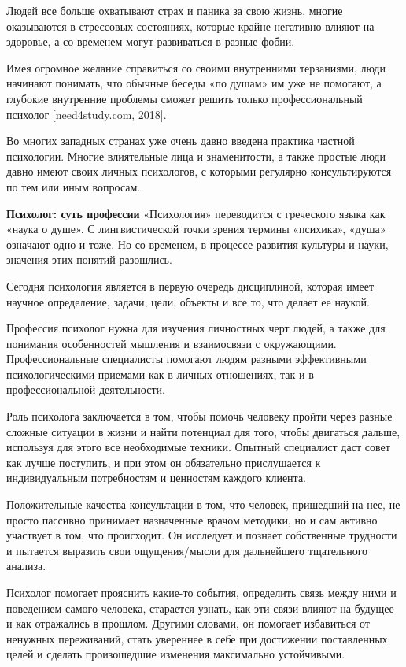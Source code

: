 Людей все больше охватывают страх и паника за свою жизнь, многие оказываются в стрессовых состояниях, которые крайне негативно влияют на здоровье, а со временем могут развиваться в разные фобии.

Имея огромное желание справиться со своими внутренними терзаниями, люди начинают понимать, что обычные беседы «по душам» им уже не помогают, а глубокие внутренние проблемы сможет решить только профессиональный психолог [need4study.com, 2018].

Во многих западных странах уже очень давно введена практика частной психологии. Многие влиятельные лица и знаменитости, а также простые люди давно имеют своих личных психологов, с которыми регулярно консультируются по тем или иным вопросам.

\textbf{Психолог: суть профессии}
«Психология» переводится с греческого языка как «наука о душе». С лингвистической точки зрения термины «психика», «душа» означают одно и тоже. Но со временем, в процессе развития культуры и науки, значения этих понятий разошлись.

Сегодня психология является в первую очередь дисциплиной, которая имеет научное определение, задачи, цели, объекты и все то, что делает ее наукой.

Профессия психолог нужна для изучения личностных черт людей, а также для понимания особенностей мышления и взаимосвязи с окружающими. Профессиональные специалисты помогают людям разными эффективными психологическими приемами как в личных отношениях, так и в профессиональной деятельности.

Роль психолога заключается в том, чтобы помочь человеку пройти через разные сложные ситуации в жизни и найти потенциал для того, чтобы двигаться дальше, используя для этого все необходимые техники. Опытный специалист даст совет как лучше поступить, и при этом он обязательно прислушается к индивидуальным потребностям и ценностям каждого клиента.

Положительные качества консультации в том, что человек, пришедший на нее, не просто пассивно принимает назначенные врачом методики, но и сам активно участвует в том, что происходит. Он исследует и познает собственные трудности и пытается выразить свои ощущения/мысли для дальнейшего тщательного анализа.

Психолог помогает прояснить какие-то события, определить связь между ними и поведением самого человека, старается узнать, как эти связи влияют на будущее и как отражались в прошлом. Другими словами, он помогает избавиться от ненужных переживаний, стать увереннее в себе при достижении поставленных целей и сделать произошедшие изменения максимально устойчивыми.

